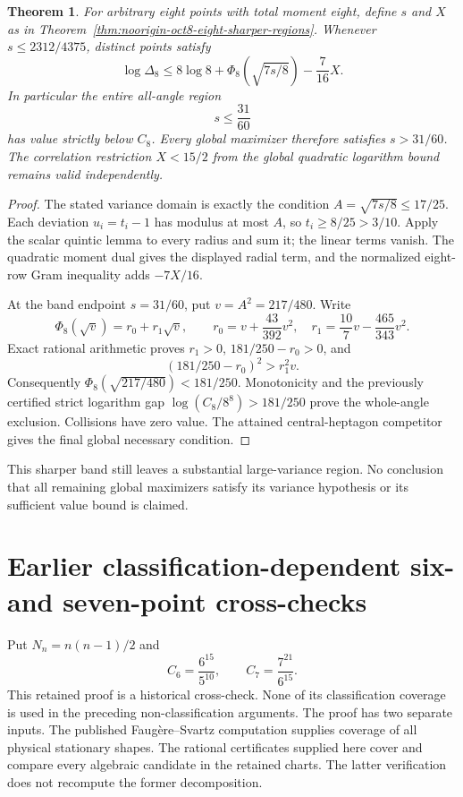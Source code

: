 \documentclass[11pt]{article}
\newtheorem{theorem}{Theorem}[section]
\theoremstyle{remark}
\numberwithin{equation}{section}
\begin{document}
\begin{theorem}\label{thm:noorigin-oct8-eight-quintic-band}
For arbitrary eight points with total moment eight, define $s$ and
$X$ as in Theorem~\ref{thm:noorigin-oct8-eight-sharper-regions}.
Whenever $s\le2312/4375$, distinct points satisfy
\[
       \log\Delta_8\le8\log8+
             \Phi_8\!\left(\sqrt{7s/8}\right)-\frac7{16}X.
\]
In particular the entire all-angle region
\[
                       s\le\frac{31}{60}
\]
has value strictly below $C_8$. Every global maximizer therefore
satisfies $s>31/60$. The correlation restriction $X<15/2$ from
the global quadratic logarithm bound remains valid independently.
\end{theorem}
\begin{proof}
The stated variance domain is exactly the condition
$A=\sqrt{7s/8}\le17/25$. Each deviation $u_i=t_i-1$ has
modulus at most $A$, so $t_i\ge8/25>3/10$. Apply the scalar
quintic lemma to every radius and sum it; the linear terms vanish.
The quadratic moment dual gives the displayed radial term, and
the normalized eight-row Gram inequality adds $-7X/16$.

At the band endpoint $s=31/60$, put $v=A^2=217/480$. Write
\[
 \Phi_8(\sqrt v)=r_0+r_1\sqrt v,\qquad
 r_0=v+\frac{43}{392}v^2,\quad
 r_1=\frac{10}{7}v-\frac{465}{343}v^2.
\]
Exact rational arithmetic proves $r_1>0$,
$181/250-r_0>0$, and
\[
                 (181/250-r_0)^2>r_1^2v.
\]
Consequently $\Phi_8(\sqrt{217/480})<181/250$.
Monotonicity and the previously certified strict logarithm gap
$\log(C_8/8^8)>181/250$ prove the whole-angle exclusion.
Collisions have zero value. The attained central-heptagon
competitor gives the final global necessary condition.
\end{proof}

This sharper band still leaves a substantial large-variance region.
No conclusion that all remaining global maximizers satisfy its
variance hypothesis or its sufficient value bound is claimed.

\section{Earlier classification-dependent six- and seven-point cross-checks}
\label{sec:six-seven-improved-proof}

Put $N_n=n(n-1)/2$ and
\[
 C_6=\frac{6^{15}}{5^{10}},\qquad
 C_7=\frac{7^{21}}{6^{15}}.
\]
This retained proof is a historical cross-check. None of its classification
coverage is used in the preceding non-classification arguments.
The proof has two separate inputs. The published Faug\`ere--Svartz
computation supplies coverage of all physical stationary shapes.
The rational certificates supplied here cover and compare every algebraic
candidate in the retained charts. The latter verification does not
recompute the former decomposition.
\end{document}
